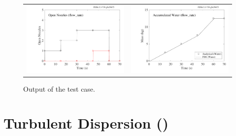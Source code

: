 \documentclass[11pt]{book}
\begin{document}
\begin{figure}[ht]
\begin{tabular*}{\textwidth}{lr}
\includegraphics[width=3.2in]{SCRIPT_FIGURES/flow_rate_2_open_nozzles} &
\includegraphics[width=3.2in]{SCRIPT_FIGURES/flow_rate_2_water_mass}
\end{tabular*}
\caption[The  case]{Output of the  test case.}
\label{flow_rate_2_figure}
\end{figure}


\clearpage

\section{Turbulent Dispersion (\texorpdfstring{{}}{random\_walk}) }
\label{turbulent_dispersion}
\label{random_walk}
\end{document}
